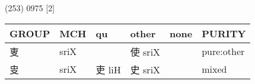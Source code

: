 \documentclass[14pt,a4paper]{scrartcl}
\begin{document}
(253) 0975 {[}2{]}

\begin{longtable}[c]{@{}llllll@{}}
\toprule
\begin{minipage}[b]{0.14\columnwidth}\raggedright\strut
GROUP
\strut\end{minipage} &
\begin{minipage}[b]{0.14\columnwidth}\raggedright\strut
MCH
\strut\end{minipage} &
\begin{minipage}[b]{0.14\columnwidth}\raggedright\strut
qu
\strut\end{minipage} &
\begin{minipage}[b]{0.14\columnwidth}\raggedright\strut
other
\strut\end{minipage} &
\begin{minipage}[b]{0.14\columnwidth}\raggedright\strut
none
\strut\end{minipage} &
\begin{minipage}[b]{0.14\columnwidth}\raggedright\strut
PURITY
\strut\end{minipage}\tabularnewline
\midrule
\endhead
\begin{minipage}[t]{0.14\columnwidth}\raggedright\strut
叓
\strut\end{minipage} &
\begin{minipage}[t]{0.14\columnwidth}\raggedright\strut
sriX
\strut\end{minipage} &
\begin{minipage}[t]{0.14\columnwidth}\raggedright\strut
\strut\end{minipage} &
\begin{minipage}[t]{0.14\columnwidth}\raggedright\strut
使 sriX
\strut\end{minipage} &
\begin{minipage}[t]{0.14\columnwidth}\raggedright\strut
\strut\end{minipage} &
\begin{minipage}[t]{0.14\columnwidth}\raggedright\strut
pure:other
\strut\end{minipage}\tabularnewline
\begin{minipage}[t]{0.14\columnwidth}\raggedright\strut
㕜
\strut\end{minipage} &
\begin{minipage}[t]{0.14\columnwidth}\raggedright\strut
sriX
\strut\end{minipage} &
\begin{minipage}[t]{0.14\columnwidth}\raggedright\strut
吏 liH
\strut\end{minipage} &
\begin{minipage}[t]{0.14\columnwidth}\raggedright\strut
史 sriX
\strut\end{minipage} &
\begin{minipage}[t]{0.14\columnwidth}\raggedright\strut
\strut\end{minipage} &
\begin{minipage}[t]{0.14\columnwidth}\raggedright\strut
mixed
\strut\end{minipage}\tabularnewline
\bottomrule
\end{longtable}
\end{document}
